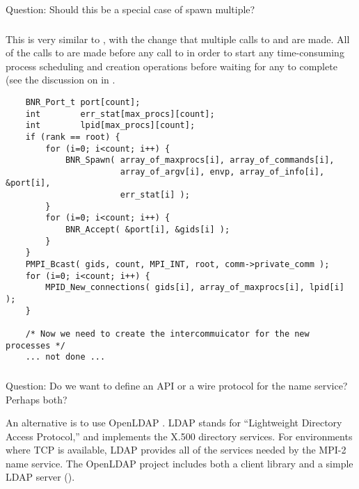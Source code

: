 \documentclass{article}
\begin{document}
Question:  Should this be a special case of spawn multiple?

\subsubsection{}

This is very similar to , with the change that
multiple calls to  and  are made.
All of the calls to  are made before any call to
 in order to start any time-consuming process scheduling
and creation operations before waiting for any to complete (see the discussion
on  in .
\begin{verbatim}
    BNR_Port_t port[count];
    int        err_stat[max_procs][count];
    int        lpid[max_procs][count];
    if (rank == root) {
        for (i=0; i<count; i++) {
            BNR_Spawn( array_of_maxprocs[i], array_of_commands[i], 
                       array_of_argv[i], envp, array_of_info[i], &port[i], 
                       err_stat[i] );
        }
        for (i=0; i<count; i++) {
            BNR_Accept( &port[i], &gids[i] );
        }
    }
    PMPI_Bcast( gids, count, MPI_INT, root, comm->private_comm );
    for (i=0; i<count; i++) {
        MPID_New_connections( gids[i], array_of_maxprocs[i], lpid[i] );
    }

    /* Now we need to create the intercommuicator for the new processes */
    ... not done ...
\end{verbatim}

\subsubsection{}
Question:  Do we want to define an API or a wire protocol for the name
service?  Perhaps both?

An alternative is to use OpenLDAP \cite{openldap}.  LDAP stands for
``Lightweight Directory Access Protocol,'' and implements the X.500
directory services.  For environments where TCP is available, LDAP
provides all of the services needed by the MPI-2 name service.  The
OpenLDAP project includes both a client library and a simple LDAP
server ().  
\end{document}
